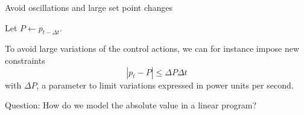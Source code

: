 \begin{frame} {Avoid oscillations and large set point changes} 

    Let $P \leftarrow p_{t-\Delta t}$.
    
    To avoid large variations of the control actions, we can for instance impose new constraints 
    $$| p_t - P| \leq \Delta P \Delta t$$
    with $\Delta P$, a parameter to limit variations expressed in power units per second.

    Question: How do we model the absolute value in a linear program?
\end{frame}


%    
